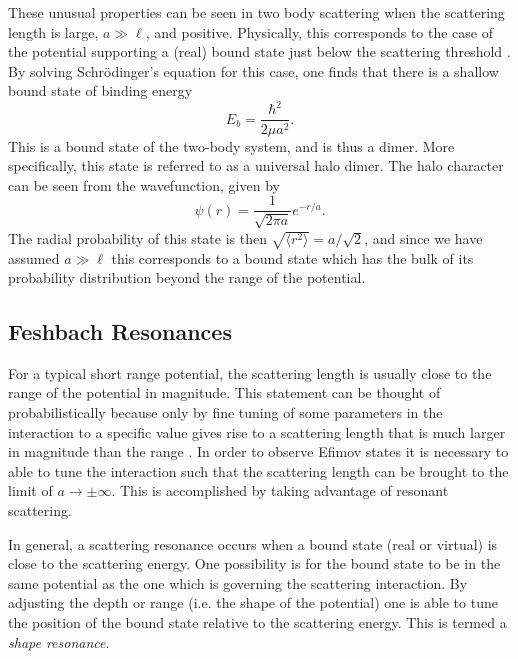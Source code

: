 \documentclass[prl,onecolumn,amsmath,amssymb,titlepage,nofootinbib,preprint]{revtex4-1}
\begin{document}
	These unusual properties can be seen in two body scattering when the scattering length is large, $a\gg\ell$, and positive.  Physically, this corresponds to the case of the potential supporting a (real) bound state just below the scattering threshold \cite{Chin2010}\cite{Kohler2006}.  By solving Schr\"odinger's equation for this case, one finds that there is a shallow bound state of binding energy
	\begin{equation}\label{eq:halo_dimer_binding energy}
		E_{b}=\frac{\hbar^{2}}{2\mu a^{2}}.
	\end{equation}
	This is a bound state of the two-body system, and is thus a dimer.  More specifically, this state is referred to as a universal halo dimer.  The halo character can be seen from the wavefunction, given by 
	\begin{equation}\label{eq:halo_dimer_wvfnc}
		\psi(r)=\frac{1}{\sqrt{2\pi a}}e^{-r/a}.
	\end{equation}
	The radial probability of this state is then $\sqrt{\langle r^{2}\rangle}=a/\sqrt{2}$, and since we have assumed $a\gg\ell$ this corresponds to a bound state which has the bulk of its probability distribution beyond the range of the potential.
	
	\subsection{Feshbach Resonances}
	For a typical short range potential, the scattering length is usually close to the range of the potential in magnitude.  This statement can be thought of probabilistically because only by fine tuning of some parameters in the interaction to a specific value gives rise to a scattering length that is much larger in magnitude than the range \cite{Braaten_2006}.  In order to observe Efimov states it is necessary to able to tune the interaction such that the scattering length can be brought to the limit of $a\rightarrow\pm\infty$.  This is accomplished by taking advantage of resonant scattering.
	
	In general, a scattering resonance occurs when a bound state (real or virtual) is close to the scattering energy.  One possibility is for the bound state to be in the same potential as the one which is governing the scattering interaction.  By adjusting the depth or range (i.e. the shape of the potential) one is able to tune the position of the bound state relative to the scattering energy.  This is termed a \textit{shape resonance}.
	
\end{document}
